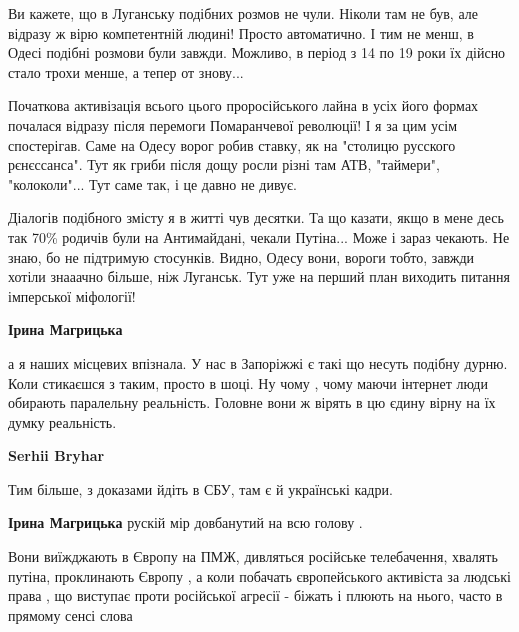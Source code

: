 \begin{itemize}
\begin{itemize}
Ви кажете, що в Луганську подібних розмов не чули. Ніколи там не був, але
відразу ж вірю компетентній людині! Просто автоматично. І тим не менш, в Одесі
подібні розмови були завжди. Можливо, в період з 14 по 19 роки їх дійсно стало
трохи менше, а тепер от знову... 

Початкова активізація всього цього проросійського лайна в усіх його формах
почалася відразу після перемоги Помаранчевої революції! І я за цим усім
спостерігав. Саме на Одесу ворог робив ставку, як на "столицю русского
рєнєссанса". Тут як гриби після дощу росли різні там АТВ, "таймери",
"колоколи"... Тут саме так, і це давно не дивує.

Діалогів подібного змісту я в житті чув десятки. Та що казати, якщо в мене десь
так 70\% родичів були на Антимайдані, чекали Путіна... Може і зараз чекають. Не
знаю, бо не підтримую стосунків. Видно, Одесу вони, вороги тобто, завжди хотіли
знааачно більше, ніж Луганськ. Тут уже на перший план виходить питання
імперської міфології!

 
\textbf{Ірина Магрицька} 

а я наших місцевих впізнала. У нас в Запоріжжі є такі що несуть подібну дурню.
Коли стикаєшся з таким, просто в шоці. Ну чому , чому маючи інтернет люди
обирають паралельну реальність. Головне вони ж вірять в цю єдину вірну на їх
думку реальність.


 
\textbf{Serhii Bryhar} 

Тим більше, з доказами йдіть в СБУ, там є й українські кадри.

 
\textbf{Ірина Магрицька} рускій мір довбанутий на всю голову .

Вони виїжджають в Європу на ПМЖ, дивляться російське телебачення, хвалять
путіна, проклинають Європу , а коли побачать європейського активіста за людські
права , що виступає проти російської агресії - біжать і плюють на нього, часто
в прямому сенсі слова


\end{itemize}
\end{itemize}
